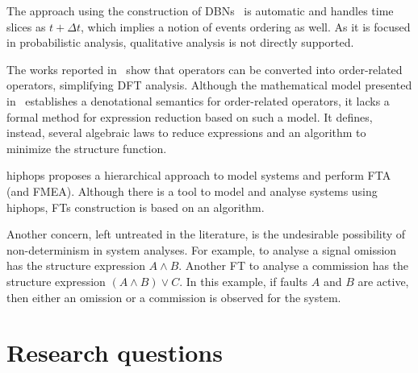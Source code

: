 The approach using the construction of \acp{DBN}~\cite{BRM+2005} is automatic and handles time slices as $t + \Delta t$, which implies a notion of events ordering as well.
As it is focused in probabilistic analysis, qualitative analysis is not directly supported.

The works reported in~\cite{Merle2010,XTD2012} show that  operators can be converted into order-related operators, simplifying \ac{DFT} analysis.
Although the mathematical model presented in~\cite{Merle2010} establishes a denotational semantics for order-related operators, it lacks a formal method for expression reduction based on such a model.
It defines, instead, several algebraic laws to reduce expressions and an algorithm to minimize the structure function.

\begin{sloppypar}
\Ac{hiphops} proposes a hierarchical approach to model systems and perform \ac{FTA} (and \ac{FMEA}).
Although there is a tool to model and analyse systems using \ac{hiphops}, \acp{FT} construction is based on an algorithm.%
\end{sloppypar}


\begin{sloppypar}
Another concern, left untreated in the literature, is the undesirable possibility of non-determinism in system analyses.
For example,  to analyse a signal omission has the structure expression $A \land B$.
Another \ac{FT} to analyse a commission has the structure expression $\left(A \land B\right) \lor C$.
In this example, if faults $A$ and $B$ are active, then either an omission or a commission is observed for the system.
\end{sloppypar}

\section{Research questions}
\label{sec:research-questions}

